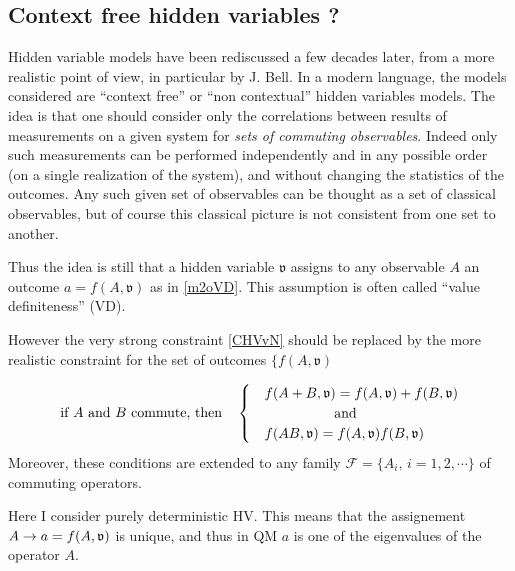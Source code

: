 
\subsection{Context free hidden variables ?}
Hidden variable models have been rediscussed a few decades later, from a more realistic point of view, in particular by J. Bell.
In a modern language, the models considered are  ``context free'' or ``non contextual''  hidden variables models. 
The idea is that one should consider only the correlations between results of  measurements  on a given system for \emph{sets of commuting observables}. Indeed only such measurements can be performed independently and in any possible order (on a single realization of the system), and without changing the statistics of the outcomes. Any such given set  of observables can be thought as a set of classical observables, but of course this classical picture is not consistent from one set to another.

Thus the idea is still that a hidden variable $\mathfrak{v}$ assigns to any observable $A$ an outcome $a=f(A,\mathfrak{v})$ as in \ref{m2oVD}.
This assumption is often called ``value definiteness'' (VD).

However the very strong constraint \ref{CHVvN} should be replaced by the more realistic constraint for the set of outcomes $\{f(A,\mathfrak{v})$

\begin{align}
\label{CHVNCon}
\text{if $A$ and $B$ commute, then}\quad\begin{cases}
      & f(A+B,\mathfrak{v})=f(A,\mathfrak{v})+f(B,\mathfrak{v})\\
      &\hskip 5em \text{and} \\
      & f(AB,\mathfrak{v})=f(A,\mathfrak{v})f(B,\mathfrak{v})
\end{cases}
\end{align}
Moreover, these conditions are extended to  any  family $\mathcal{F}=\{A_i,\,i=1,2,\cdots\}$ of commuting operators.

Here I consider purely deterministic HV. This means that the assignement  $A\to a=f(A,\frak{v})$ is unique, and thus in QM $a$ is one of the eigenvalues of the operator $A$. 

